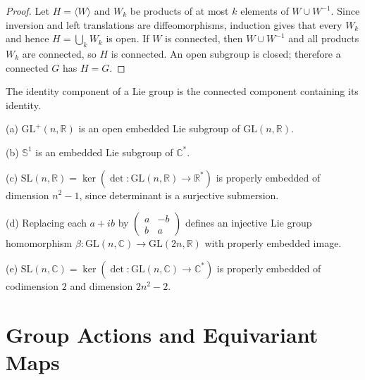 \begin{proof}

\sketch Let $H=\langle W\rangle$ and $W_k$ be products of at most $k$ elements of $W\cup W^{-1}$. Since inversion and left translations are diffeomorphisms, induction gives that every $W_k$ and hence $H=\bigcup_kW_k$ is open. If $W$ is connected, then $W\cup W^{-1}$ and all products $W_k$ are connected, so $H$ is connected. An open subgroup is closed; therefore a connected $G$ has $H=G$.
\end{proof}

\begin{definition}
\label{def:7-49-extra-3}




The identity component of a Lie group is the connected component containing its identity.
\end{definition}

\begin{example}
\label{ex:7-18}





(a) $\mathrm{GL}^{+}(n,\mathbb R)$ is an open embedded Lie subgroup of
$\mathrm{GL}(n,\mathbb R)$.

(b) $\mathbb S^1$ is an embedded Lie subgroup of $\mathbb C^*$.

(c) $\mathrm{SL}(n,\mathbb R)
=\ker(\det:\mathrm{GL}(n,\mathbb R)\to\mathbb R^*)$ is properly embedded of
dimension $n^2-1$, since determinant is a surjective submersion.

(d) Replacing each $a+ib$ by
$\left(\begin{smallmatrix}a&-b\\b&a\end{smallmatrix}\right)$ defines an
injective Lie group homomorphism
$\beta:\mathrm{GL}(n,\mathbb C)\to\mathrm{GL}(2n,\mathbb R)$ with properly
embedded image.

(e) $\mathrm{SL}(n,\mathbb C)
=\ker(\det:\mathrm{GL}(n,\mathbb C)\to\mathbb C^*)$ is properly embedded of
codimension $2$ and dimension $2n^2-2$.
\end{example}

\section{Group Actions and Equivariant Maps}

